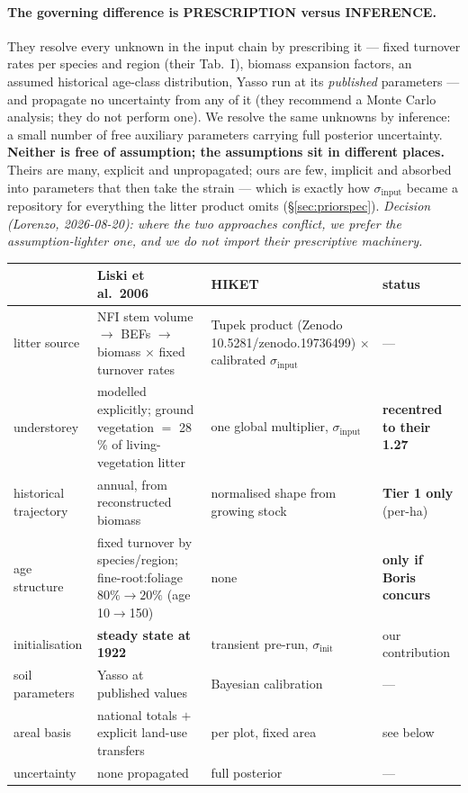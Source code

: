 \documentclass[11pt]{article}
\newcommand{\sinit}{\sigma_{\mathrm{init}}}
\newcommand{\sinput}{\sigma_{\mathrm{input}}}
\begin{document}
\paragraph{The governing difference is PRESCRIPTION versus INFERENCE.} They resolve every unknown in
the input chain by prescribing it --- fixed turnover rates per species and region (their Tab.~I),
biomass expansion factors, an assumed historical age-class distribution, Yasso run at its
\emph{published} parameters --- and propagate no uncertainty from any of it (they recommend a Monte
Carlo analysis; they do not perform one). We resolve the same unknowns by inference: a small number
of free auxiliary parameters carrying full posterior uncertainty. \textbf{Neither is free of
assumption; the assumptions sit in different places.} Theirs are many, explicit and unpropagated;
ours are few, implicit and absorbed into parameters that then take the strain --- which is exactly
how $\sinput$ became a repository for everything the litter product omits (\S\ref{sec:priorspec}).
\emph{Decision (Lorenzo, 2026-08-20): where the two approaches conflict, we prefer the
assumption-lighter one, and we do not import their prescriptive machinery.}

\begin{center}\small
\begin{tabular}{@{}p{3.0cm}p{4.6cm}p{4.6cm}p{2.6cm}@{}}
\toprule
 & Liski et al.\ 2006 & HIKET & status \\
\midrule
litter source & NFI stem volume $\to$ BEFs $\to$ biomass $\times$ fixed turnover rates & Tupek product
(Zenodo 10.5281/zenodo.19736499) $\times$ calibrated $\sinput$ & --- \\
understorey & modelled explicitly; ground vegetation $=$ 28\,\% of living-vegetation litter &
one global multiplier, $\sinput$ & \textbf{recentred to their 1.27} \\
historical trajectory & annual, from reconstructed biomass & normalised shape from growing stock &
\textbf{Tier 1 only} (per-ha) \\
age structure & fixed turnover by species/region; fine-root:foliage $80\%\!\to\!20\%$ (age 10$\to$150)
& none & \textbf{only if Boris concurs} \\
initialisation & \textbf{steady state at 1922} & transient pre-run, $\sinit$ & our contribution \\
soil parameters & Yasso at published values & Bayesian calibration & --- \\
areal basis & national totals $+$ explicit land-use transfers & per plot, fixed area & see below \\
uncertainty & none propagated & full posterior & --- \\
\bottomrule
\end{tabular}
\end{center}
\end{document}

